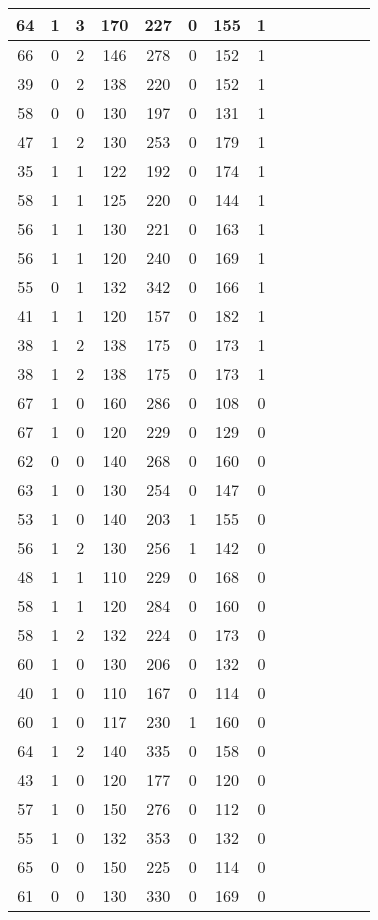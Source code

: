 \documentclass{article}
\begin{document}
\begin{longtable}{|c|c|c|c|c|c|c|c|c|c|c|c|c|c|}
\hline
64 & 1 & 3 & 170 & 227 & 0 & 155 & 1\\
\hline
66 & 0 & 2 & 146 & 278 & 0 & 152 & 1\\
\hline
39 & 0 & 2 & 138 & 220 & 0 & 152 & 1\\
\hline
58 & 0 & 0 & 130 & 197 & 0 & 131 & 1\\
\hline
47 & 1 & 2 & 130 & 253 & 0 & 179 & 1\\
\hline
35 & 1 & 1 & 122 & 192 & 0 & 174 & 1\\
\hline
58 & 1 & 1 & 125 & 220 & 0 & 144 & 1\\
\hline
56 & 1 & 1 & 130 & 221 & 0 & 163 & 1\\
\hline
56 & 1 & 1 & 120 & 240 & 0 & 169 & 1\\
\hline
55 & 0 & 1 & 132 & 342 & 0 & 166 & 1\\
\hline
41 & 1 & 1 & 120 & 157 & 0 & 182 & 1\\
\hline
38 & 1 & 2 & 138 & 175 & 0 & 173 & 1\\
\hline
38 & 1 & 2 & 138 & 175 & 0 & 173 & 1\\
\hline
67 & 1 & 0 & 160 & 286 & 0 & 108 & 0\\
\hline
67 & 1 & 0 & 120 & 229 & 0 & 129 & 0\\
\hline
62 & 0 & 0 & 140 & 268 & 0 & 160 & 0\\
\hline
63 & 1 & 0 & 130 & 254 & 0 & 147 & 0\\
\hline
53 & 1 & 0 & 140 & 203 & 1 & 155 & 0\\
\hline
56 & 1 & 2 & 130 & 256 & 1 & 142 & 0\\
\hline
48 & 1 & 1 & 110 & 229 & 0 & 168 & 0\\
\hline
58 & 1 & 1 & 120 & 284 & 0 & 160 & 0\\
\hline
58 & 1 & 2 & 132 & 224 & 0 & 173 & 0\\
\hline
60 & 1 & 0 & 130 & 206 & 0 & 132 & 0\\
\hline
40 & 1 & 0 & 110 & 167 & 0 & 114 & 0\\
\hline
60 & 1 & 0 & 117 & 230 & 1 & 160 & 0\\
\hline
64 & 1 & 2 & 140 & 335 & 0 & 158 & 0\\
\hline
43 & 1 & 0 & 120 & 177 & 0 & 120 & 0\\
\hline
57 & 1 & 0 & 150 & 276 & 0 & 112 & 0\\
\hline
55 & 1 & 0 & 132 & 353 & 0 & 132 & 0\\
\hline
65 & 0 & 0 & 150 & 225 & 0 & 114 & 0\\
\hline
61 & 0 & 0 & 130 & 330 & 0 & 169 & 0\\

\end{longtable}
\end{document}
